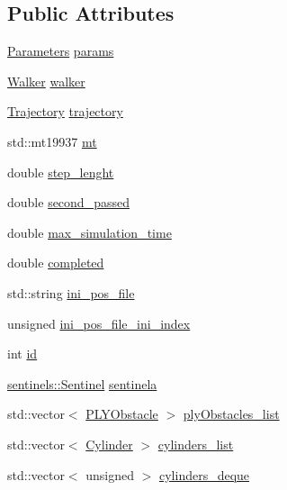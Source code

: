 \subsection*{Public Attributes}
\begin{DoxyCompactItemize}
\item 
\hyperlink{class_parameters}{Parameters} \hyperlink{class_dynamics_simulation_a67cd4cd9a2e7cd2339c98dae60e66dde}{params}
\item 
\hyperlink{class_walker}{Walker} \hyperlink{class_dynamics_simulation_a9a5d2596527abdcdd185430c97dea9ad}{walker}
\item 
\hyperlink{class_trajectory}{Trajectory} \hyperlink{class_dynamics_simulation_ab69fedf7129784621eec440ba873218d}{trajectory}
\item 
std\+::mt19937 \hyperlink{class_dynamics_simulation_a03ba104f00ae772e9b8fb55e7878c793}{mt}
\item 
double \hyperlink{class_dynamics_simulation_ad6dddce1d5bc30d3e61dceb69652c893}{step\+\_\+lenght}
\item 
double \hyperlink{class_dynamics_simulation_a46187e70aad2b130249ba3d1dd6a3c75}{second\+\_\+passed}
\item 
double \hyperlink{class_dynamics_simulation_a337972272af798cb8606796116145d11}{max\+\_\+simulation\+\_\+time}
\item 
double \hyperlink{class_dynamics_simulation_a6a210fb28fe2f996c226614742a25214}{completed}
\item 
std\+::string \hyperlink{class_dynamics_simulation_a4fb0e535753c48b4a2647502379aebaf}{ini\+\_\+pos\+\_\+file}
\item 
unsigned \hyperlink{class_dynamics_simulation_a8e20cd71b55dda041844cfc305851dbe}{ini\+\_\+pos\+\_\+file\+\_\+ini\+\_\+index}
\item 
int \hyperlink{class_dynamics_simulation_aa178498c8be8af1a515a8c0a02187600}{id}
\item 
\hyperlink{classsentinels_1_1_sentinel}{sentinels\+::\+Sentinel} \hyperlink{class_dynamics_simulation_aed384434dc469e766301268dcf1ec4ab}{sentinela}
\item 
std\+::vector$<$ \hyperlink{class_p_l_y_obstacle}{P\+L\+Y\+Obstacle} $>$ \hyperlink{class_dynamics_simulation_a4e7e45353d8485033987e2f3d9f045e6}{ply\+Obstacles\+\_\+list}
\item 
std\+::vector$<$ \hyperlink{class_cylinder}{Cylinder} $>$ \hyperlink{class_dynamics_simulation_aece9e3dbb07e4ab3387a008bf2d94493}{cylinders\+\_\+list}
\item 
std\+::vector$<$ unsigned $>$ \hyperlink{class_dynamics_simulation_a927a79875ff2f035d929229cf4471756}{cylinders\+\_\+deque}

\end{DoxyCompactItemize}

